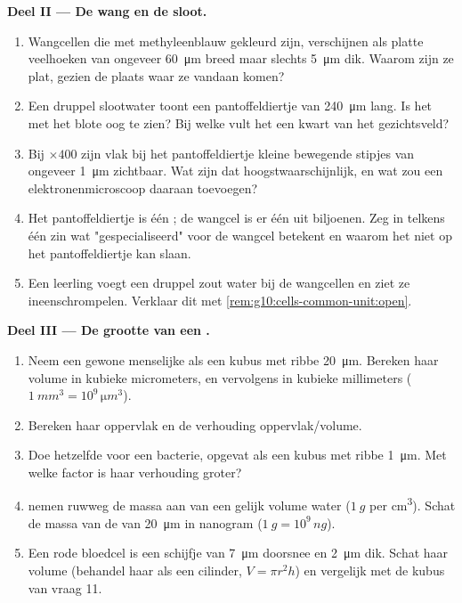 \begin{problem}
\medskip
\noindent\textbf{Deel II --- De wang en de sloot.}
\begin{enumerate}[resume]
  \item Wangcellen die met methyleenblauw gekleurd zijn, verschijnen als
        platte veelhoeken van ongeveer \qty{60}{\micro m} breed maar
        slechts \qty{5}{\micro m} dik. Waarom zijn ze plat, gezien de
        plaats waar ze vandaan komen?
  \item Een druppel slootwater toont een pantoffeldiertje van
        \qty{240}{\micro m} lang. Is het met het blote oog te zien? Bij
        welke  vult het een kwart van het gezichtsveld?
  \item Bij $\times 400$ zijn vlak bij het pantoffeldiertje kleine
        bewegende stipjes van ongeveer \qty{1}{\micro m} zichtbaar. Wat
        zijn dat hoogstwaarschijnlijk, en wat zou een
        elektronenmicroscoop daaraan toevoegen?
  \item Het pantoffeldiertje is één ; de wangcel is er één uit
        biljoenen. Zeg in telkens één zin wat "gespecialiseerd" voor de
        wangcel betekent en waarom het niet op het pantoffeldiertje kan
        slaan.
  \item Een leerling voegt een druppel zout water bij de wangcellen en
        ziet ze ineenschrompelen. Verklaar dit met
        \cref{rem:g10:cells-common-unit:open}.
\end{enumerate}

\medskip
\noindent\textbf{Deel III --- De grootte van een .}
\begin{enumerate}[resume]
  \item Neem een gewone menselijke  als een kubus met ribbe
        \qty{20}{\micro m}. Bereken haar volume in kubieke micrometers,
        en vervolgens in kubieke millimeters
        ($\qty{1}{mm^3} = 10^9\,\unit{\micro m^3}$).
  \item Bereken haar oppervlak en de verhouding oppervlak/volume.
  \item Doe hetzelfde voor een bacterie, opgevat als een kubus met ribbe
        \qty{1}{\micro m}. Met welke factor is haar verhouding groter?
  \item {} nemen ruwweg de massa aan van een gelijk volume water
        ($\qty{1}{g}$ per \unit{cm^3}). Schat de massa van de  van
        \qty{20}{\micro m} in nanogram
        ($\qty{1}{g} = 10^9\,\unit{ng}$).
  \item Een rode bloedcel is een schijfje van \qty{7}{\micro m} doorsnee
        en \qty{2}{\micro m} dik. Schat haar volume (behandel haar als
        een cilinder, $V = \pi r^2 h$) en vergelijk met de kubus van
        vraag 11.
\end{enumerate}


\end{problem}
